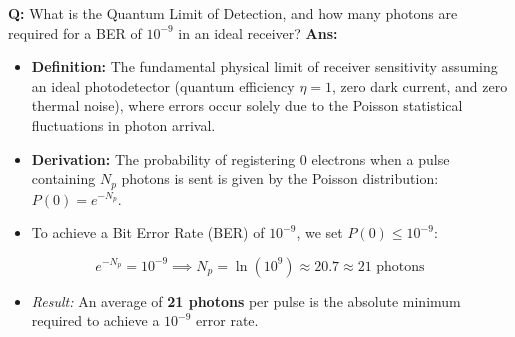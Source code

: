\documentclass[10pt,a4paper,twocolumn]{article}
\begin{document}
\begin{tcolorbox}[
  colback=white,
  colframe=UnitColorFour,
  colbacktitle=gray!10!white,
  coltitle=black,
  fonttitle=\bfseries\sffamily\small,
  title={Unit IV $\bullet$ Card 9: Quantum Limit of Detection},
  boxrule=1.2pt,
  arc=2mm,
  outer arc=2mm,
  boxsep=1.5mm,
  top=1mm,
  bottom=1mm,
  left=1.5mm,
  right=1.5mm,
  before skip=2.5mm,
  after skip=2.5mm
]
\textbf{Q:} What is the Quantum Limit of Detection, and how many photons are required for a BER of $10^{-9}$ in an ideal receiver?
\tcbline
\textbf{Ans:} \begin{itemize}
  \item   \textbf{Definition:} The fundamental physical limit of receiver sensitivity assuming an ideal photodetector (quantum efficiency $\eta = 1$, zero dark current, and zero thermal noise), where errors occur solely due to the Poisson statistical fluctuations in photon arrival.
  \item   \textbf{Derivation:} The probability of registering $0$ electrons when a pulse containing $N_p$ photons is sent is given by the Poisson distribution: $P(0) = e^{-N_p}$.
  \item   To achieve a Bit Error Rate (BER) of $10^{-9}$, we set $P(0) \le 10^{-9}$:
\end{itemize}
        \[ e^{-N_p} = 10^{-9} \implies N_p = \ln(10^9) \approx 20.7 \approx 21\text{ photons} \]
\begin{itemize}
  \item   \textit{Result:} An average of \textbf{21 photons} per pulse is the absolute minimum required to achieve a $10^{-9}$ error rate.
\end{itemize}
\end{tcolorbox}
\end{document}
